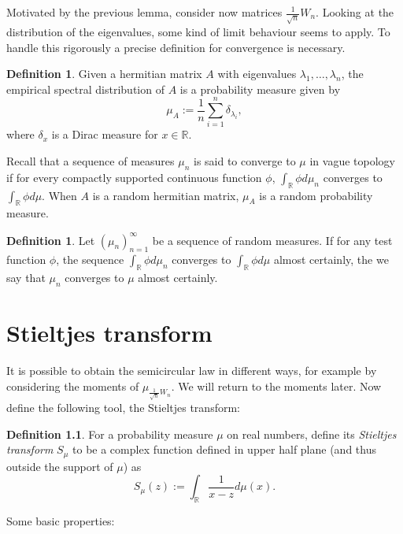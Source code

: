 \documentclass[12pt,a4paper,leqno]{report}
\newcommand{\R}{\mathbb{R}}
\theoremstyle{plain}
\theoremstyle{definition}
\newtheorem{defi}[equation]{Definition}
\theoremstyle{remark}
\begin{document}
Motivated by the previous lemma, consider now matrices $\frac{1}{\sqrt{n}}W_n$. Looking at the distribution of the eigenvalues, some kind of limit behaviour seems to apply. To handle this rigorously a precise definition for convergence is necessary.

\begin{defi}
Given a hermitian matrix $A$ with eigenvalues $\lambda_1, \ldots , \lambda_n$, the empirical spectral distribution of $A$ is a probability measure given by
\begin{equation*}
\mu_A := \frac{1}{n} \sum_{i=1}^n \delta_{\lambda_i},
\end{equation*}
where $\delta_x$ is a Dirac measure for $x \in \R$.
\end{defi}

Recall that a sequence of measures $\mu_n$ is said to converge to $\mu$ in vague topology if for every compactly supported continuous function $\phi$, $\int_{\R} \phi d\mu_n$ converges to $\int_{\R}\phi d\mu$. When $A$ is a random hermitian matrix, $\mu_A$ is a random probability measure.

\begin{defi}
Let $(\mu_n)_{n=1}^{\infty}$ be a sequence of random measures.
If for any test function $\phi$, the sequence $\int_{\R} \phi d\mu_n$ converges to $\int_{\R} \phi d\mu$ almost certainly, the we say that $\mu_n$ converges to $\mu$ almost certainly.
\end{defi}

\chapter{Stieltjes transform}\label{stieltjes}


It is possible to obtain the semicircular law in different ways, for example by considering the moments of $\mu_{\frac{1}{\sqrt{n}}W_n}$. We will return to the moments later. Now define the following tool, the Stieltjes transform:

\begin{defi}
For a probability measure $\mu$ on real numbers, define its \emph{Stieltjes transform} $S_{\mu}$ to be a complex function defined in upper half plane (and thus outside the support of $\mu$) as
\begin{equation*}
S_{\mu} (z) := \int_{\R} \frac{1}{x-z} d \mu(x).
\end{equation*}
\end{defi}

Some basic properties:
\end{document}
